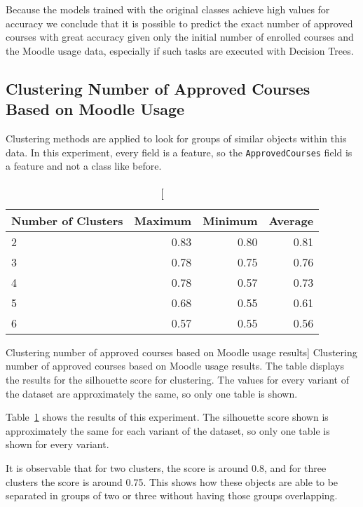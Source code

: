 Because the models trained with the original classes achieve high values for
accuracy we conclude that it is possible to predict the exact number of
approved courses with great accuracy given only the initial number of enrolled
courses and the Moodle usage data, especially if such tasks are executed with
Decision Trees.

\subsection{Clustering Number of Approved Courses Based on Moodle Usage}
\label{sec:exp_004}

Clustering methods are applied to look for groups of similar objects within
this data. In this experiment, every field is a feature, so the
\texttt{ApprovedCourses} field is a feature and not a class like before.

\begin{table}[h!]
    \centering

    \begin{tabular}{| l | r | r | r |}
        \hline
        \textbf{Number of Clusters} & \textbf{Maximum} & \textbf{Minimum} & \textbf{Average} \\ \hline
        2 & 0.83 & 0.80 & 0.81 \\ \hline
        3 & 0.78 & 0.75 & 0.76 \\ \hline
        4 & 0.78 & 0.57 & 0.73 \\ \hline
        5 & 0.68 & 0.55 & 0.61 \\ \hline
        6 & 0.57 & 0.55 & 0.56 \\ \hline
    \end{tabular}

    \caption
        [Clustering number of approved courses based on Moodle usage results]
        {Clustering number of approved courses based on Moodle usage results.
        The table displays the results for the silhouette score for clustering.
        The values for every variant of the dataset are approximately the same,
        so only one table is shown.}

    \label{tab:exp_004_res}
\end{table}

Table~\ref{tab:exp_004_res} shows the results of this experiment. The
silhouette score shown is approximately the same for each variant of the
dataset, so only one table is shown for every variant.

It is observable that for two clusters, the score is around 0.8, and for three
clusters the score is around 0.75. This shows how these objects are able to be
separated in groups of two or three without having those groups overlapping.

